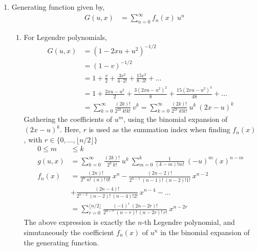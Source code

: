 \begin{enumerate}
    \item Generating function given by,
          \begin{align}
              G(u, x) & = \sum_{n = 0}^{\infty} f_n (x)\ u^n
          \end{align}
          \begin{enumerate}
              \item For Legendre polynomials,
                    \begin{align}
                        G(u, x) & = (1 - 2xu + u^2)^{-1/2}                             \\
                                & = (1 - v)^{-1/2}                                     \\
                                & = 1 + \frac{v}{2} + \frac{3v^2}{4 \cdot 2!}
                        + \frac{15v^3}{8 \cdot 3!} + \dots                             \\
                                & = 1 + \frac{2xu - u^2}{2} + \frac{3(2xu - u^2)^2}{8}
                        + \frac{15(2xu - u^2)^3}{48} + \dots                           \\
                                & = \sum_{k = 0}^{\infty} \frac{(2k)!}
                        {2^{2k}\ k!k!}\ v^k
                        = \sum_{k = 0}^{\infty} \frac{(2k)!}
                        {2^{2k}\ k!k!}\ u^k\ (2x-u)^k
                    \end{align}
                    Gathering the coefficients of $ u^m $, using the binomial expansion
                    of $ (2x - u)^k $. Here, $ r $ is used as the summation index
                    when finding $ f_n(x) $, with $ r \in \{0, \dots,
                        \lfloor n/2 \rfloor\} $
                    \begin{align}
                        0 \leq m & \leq k                                     \\
                        g(u, x)  & = \sum_{k = 0}^{\infty}\ \frac{(2k)!}
                        {2^{k}\ k!}\ u^k\
                        \sum_{m = 0}^{k} \frac{1}{(k-m)!m!}\ (-u)^m (x)^{n-m} \\
                        f_n(x)   & = \frac{(2n)!}{2^n\ n!\ (n)!\ 0!}\ x^n
                        - \frac{(2n-2)!}{2^{n-1}\ (n-1)!\ (n-2)!1!}\ x^{n-2}  \\
                                 & + \frac{(2n-4)!}
                        {2^{n-2}\ (n-2)!\ (n-4)!2!}\ x^{n-4} - \dots          \\
                                 & = \sum_{r=0}^{\lfloor n/2 \rfloor}
                        \frac{(-1)^r\ (2n-2r)!}{2^{n-r}\ (n-r)!\ (n-2r)!\ r!}\ x^{n-2r}
                    \end{align}
                    The above expression is exactly the $ n $-th Legendre polynomial, and
                    simutaneously the coefficient $ f_n(x) $ of $ u^n $ in the
                    binomial expansion of the generating function.


\end{enumerate}
\end{enumerate}
